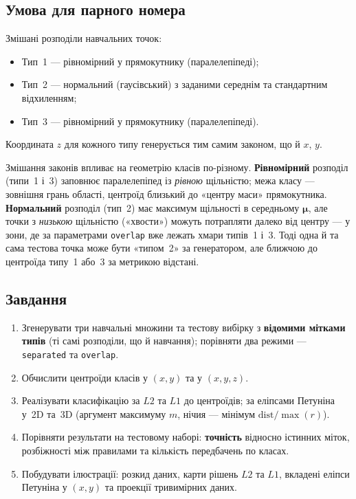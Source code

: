 \documentclass[14pt,a4paper,oneside]{extarticle}
\begin{document}
\subsection{Умова для парного номера}
Змішані розподіли навчальних точок:
\begin{itemize}
    \item Тип~1 --- рівномірний у прямокутнику (паралелепіпеді);
    \item Тип~2 --- нормальний (гаусівський) з заданими середнім та стандартним відхиленням;
    \item Тип~3 --- рівномірний у прямокутнику (паралелепіпеді).
\end{itemize}
Координата $z$ для кожного типу генерується тим самим законом, що й $x$, $y$.

Змішання законів впливає на геометрію класів по-різному. \textbf{Рівномірний} розподіл (типи~1 і~3) заповнює паралелепіпед із \emph{рівною} щільністю; межа класу --- зовнішня грань області, центроїд близький до «центру маси» прямокутника. \textbf{Нормальний} розподіл (тип~2) має максимум щільності в середньому $\boldsymbol{\mu}$, але точки з \emph{низькою} щільністю («хвости») можуть потрапляти далеко від центру --- у зони, де за параметрами \texttt{overlap} вже лежать хмари типів~1 і~3. Тоді одна й та сама тестова точка може бути «типом~2» за генератором, але ближчою до центроїда типу~1 або~3 за метрикою відстані.

\subsection{Завдання}
\begin{enumerate}
    \item Згенерувати три навчальні множини та тестову вибірку з \textbf{відомими мітками типів} (ті самі розподіли, що й навчання); порівняти два режими --- \texttt{separated} та \texttt{overlap}.
    \item Обчислити центроїди класів у $(x,y)$ та у $(x,y,z)$.
    \item Реалізувати класифікацію за $L2$ та $L1$ до центроїдів; за еліпсами Петуніна у~2D та~3D (аргумент максимуму $m$, нічия --- мінімум $\mathrm{dist}/\max(r)$).
    \item Порівняти результати на тестовому наборі: \textbf{точність} відносно істинних міток, розбіжності між правилами та кількість передбачень по класах.
    \item Побудувати ілюстрації: розкид даних, карти рішень $L2$ та $L1$, вкладені еліпси Петуніна у $(x,y)$ та проекції тривимірних даних.
\end{enumerate}
\end{document}
